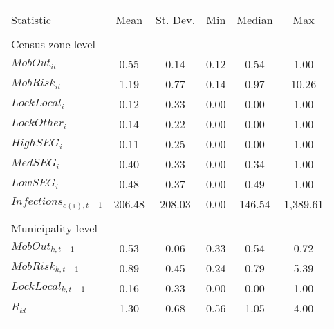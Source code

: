 \begin{tabular}{@{\extracolsep{5pt}}lccccc} 
\\[-1.8ex]\hline 
\hline \\[-1.8ex] 
Statistic & \multicolumn{1}{c}{Mean} & \multicolumn{1}{c}{St. Dev.} & \multicolumn{1}{c}{Min} & \multicolumn{1}{c}{Median} & \multicolumn{1}{c}{Max} \\ 
\hline \\[-.8ex] 
\multicolumn{6}{l}{Census zone level}\\\cline{1-1}
$MobOut_{it}$ & 0.55 & 0.14 & 0.12 & 0.54 & 1.00 \\ 
$MobRisk_{it}$ & 1.19 & 0.77 & 0.14 & 0.97 & 10.26 \\ 
$LockLocal_{i}$ & 0.12 & 0.33 & 0.00 & 0.00 & 1.00 \\ 
$LockOther_{i}$ & 0.14 & 0.22 & 0.00 & 0.00 & 1.00 \\ 
$HighSEG_i$ & 0.11 & 0.25 & 0.00 & 0.00 & 1.00 \\ 
$MedSEG_i$ & 0.40 & 0.33 & 0.00 & 0.34 & 1.00 \\ 
$LowSEG_i$ & 0.48 & 0.37 & 0.00 & 0.49 & 1.00 \\ 
$Infections_{c(i),t-1}$ & 206.48 & 208.03 & 0.00 & 146.54 & 1,389.61 \\ \\[-.8ex]
\multicolumn{6}{l}{Municipality level}\\\cline{1-1}
$MobOut_{k,t-1}$ & 0.53 & 0.06 & 0.33 & 0.54 & 0.72 \\ 
$MobRisk_{k,t-1}$ & 0.89 & 0.45 & 0.24 & 0.79 & 5.39 \\ 
$LockLocal_{k,t-1}$ & 0.16 & 0.33 & 0.00 & 0.00 & 1.00 \\ 
$R_{kt}$ & 1.30 & 0.68 & 0.56 & 1.05 & 4.00 \\ 
\hline \\[-1.8ex] 
\end{tabular} 


